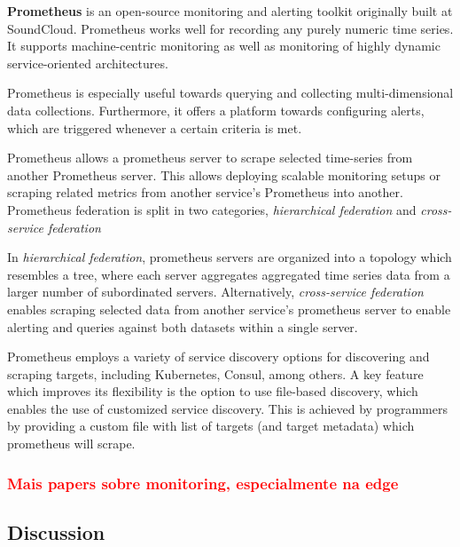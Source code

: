 \textbf{Prometheus} \cite{prometheus} is an open-source monitoring and alerting toolkit originally built at SoundCloud. Prometheus works well for recording any purely numeric time series. It supports machine-centric monitoring as well as monitoring of highly dynamic service-oriented architectures. 

Prometheus is especially useful towards querying and collecting multi-dimensional data collections. Furthermore, it offers a platform towards configuring alerts, which are triggered whenever a certain criteria is met.

Prometheus allows a prometheus server to scrape selected time-series from another Prometheus server. This allows deploying scalable monitoring setups or scraping related metrics from another service's Prometheus into another. Prometheus federation is split in two categories, \textit{hierarchical federation} and \textit{cross-service federation} 

In \textit{hierarchical federation}, prometheus servers are organized into a topology which resembles a tree, where each server aggregates aggregated time series data from a larger number of subordinated servers. Alternatively,  \textit{cross-service federation} enables scraping selected data from another service's prometheus server to enable alerting and queries against both datasets within a single server. 

Prometheus employs a variety of service discovery options for discovering and scraping targets, including Kubernetes, Consul, among others. A key feature which improves its flexibility is the option to use file-based discovery,  which enables the use of customized service discovery. This is achieved by programmers by providing a custom file with list of targets (and target metadata) which prometheus will scrape.

\subsubsection{\textcolor{red}{Mais papers sobre monitoring, especialmente na edge}}

\subsection{Discussion}
